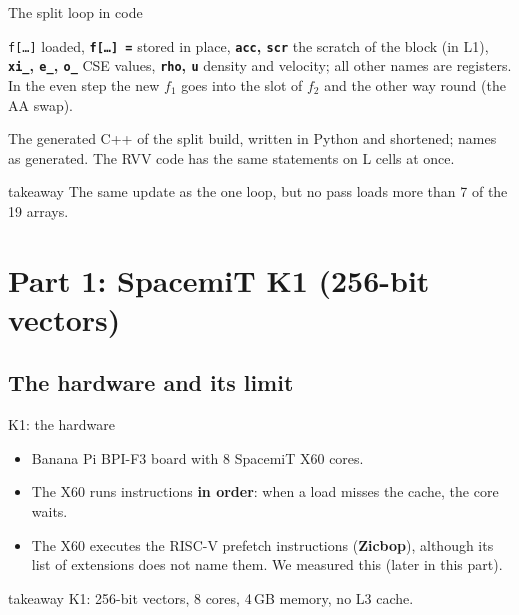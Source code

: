 \documentclass[aspectratio=169,10pt,t]{beamer}
\newcommand{\term}[1]{\textcolor{psblue!85!black}{\textbf{#1}}} %
\newcommand{\code}[1]{\texttt{#1}}
\newcommand{\takeaway}[1]{\par\vfill
  \begin{beamercolorbox}[wd=\textwidth,sep=4pt,rounded=true]{takeaway}
    \small #1
  \end{beamercolorbox}}
\begin{document}
\begin{frame}{The split loop in code}
  \vspace{1mm}
  \centering

  \vspace{1.5mm}
  \raggedright
  {\scriptsize
  \textcolor{psorange!85!black}{\code{f[\ldots]}} loaded,
  \textcolor{psblue!85!black}{\textbf{\code{f[\ldots] =}}} stored in place,
  \textcolor{ccomm!65!black}{\textbf{\code{acc}, \code{scr}}} the scratch of the block (in L1),
  \textcolor{psviolet}{\textbf{\code{xi\_}, \code{e\_}, \code{o\_}}} CSE values,
  \textcolor{psteal!65!black}{\textbf{\code{rho}, \code{u}}} density and velocity; all other names are registers.
  In the even step the new $f_1$ goes into the slot of $f_2$ and the other way round (the AA swap).\par}
  \vspace{0.5mm}
  {\scriptsize\color{psgray}The generated C++ of the split build, written in Python and shortened; names as
  generated. The RVV
  code has the same statements on L cells at once.\par}
  \takeaway{The same update as the one loop, but no pass loads more than 7 of the 19 arrays.}
\end{frame}

\section[Part 1: K1]{Part 1: SpacemiT K1 (256-bit vectors)}
\subsection{The hardware and its limit}

\begin{frame}{K1: the hardware}
  \vspace{3mm}
  \centering

  \vspace{4mm}
  \raggedright
  \begin{itemize}\small
    \item Banana Pi BPI-F3 board with 8 SpacemiT X60 cores.
    \item The X60 runs instructions \term{in order}: when a load misses the cache, the core waits.
    \item The X60 executes the RISC-V prefetch instructions (\term{Zicbop}), although its list of extensions does
          not name them. We measured this (later in this part).
  \end{itemize}
  \takeaway{K1: 256-bit vectors, 8 cores, 4\,GB memory, no L3 cache.}
\end{frame}
\end{document}
